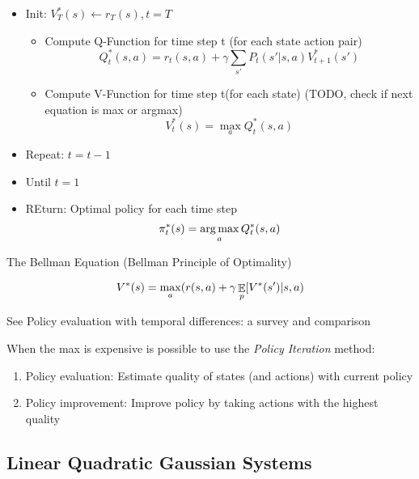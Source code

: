\begin{itemize}
  \item Init: $V_T^*(s) \leftarrow r_T(s), t=T$
    \begin{itemize}
      \item Compute Q-Function for time step t (for each state action pair)
        \begin{equation}
          Q_t^*(s,a) = r_t(s,a) + \gamma \sum_{s'} P_t (s'|s,a)V_{t+1}^*(s')
        \end{equation}
      \item Compute V-Function for time step t(for each state) (TODO, check if
        next equation is max or argmax)
        \begin{equation}
          V_t^*(s) = \max_a Q_t^*(s,a)
        \end{equation}
    \end{itemize}
  \item Repeat: $t=t-1$
  \item Until $t=1$
  \item REturn: Optimal policy for each time step
    \begin{equation}
      \pi_t^*(s) = \operatorname*{arg\,max}_a Q_t^*(s,a)
    \end{equation}
\end{itemize}

The Bellman Equation (Bellman Principle of Optimality)

\begin{equation}
  V^*(s) = \max_a (r(s,a) + \gamma \operatorname*{\mathbb{\mathop{E}}}_p[V^*(s')|s,a)
\end{equation}


See Policy evaluation with temporal differences: a survey and comparison
\cite{dann2014policy}

When the max is expensive is possible to use the \emph{Policy Iteration}
method:

\begin{enumerate}
  \item Policy evaluation: Estimate quality of states (and actions) with
    current policy
  \item Policy improvement: Improve policy by taking actions with the highest
    quality
\end{enumerate}

\subsection{Linear Quadratic Gaussian Systems}

